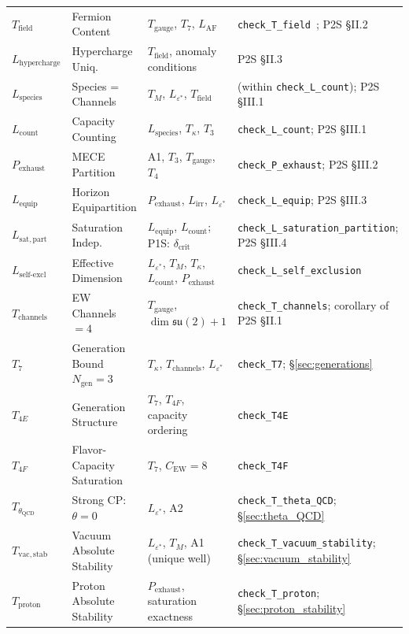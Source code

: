 \documentclass[11pt]{article}
\begin{document}
\begin{center}
\begin{tabular}{lp{3.2cm}p{4.5cm}l}
$T_{\mathrm{field}}$ & Fermion Content & $T_{\mathrm{gauge}}$, $T_7$, $L_{\mathrm{AF}}$ & \texttt{check\_T\_field}~\cite{BrookeFermionScan}; P2S \S II.2 \\
$L_{\mathrm{hypercharge}}$ & Hypercharge Uniq. & $T_{\mathrm{field}}$, anomaly conditions & P2S \S II.3 \\
$L_{\mathrm{species}}$ & Species = Channels & $T_M$, $L_{\varepsilon^*}$, $T_{\mathrm{field}}$ & (within \texttt{check\_L\_count}); P2S \S III.1 \\
$L_{\mathrm{count}}$ & Capacity Counting & $L_{\mathrm{species}}$, $T_\kappa$, $T_3$ & \texttt{check\_L\_count}; P2S \S III.1 \\
$P_{\mathrm{exhaust}}$ & MECE Partition & A1, $T_3$, $T_{\mathrm{gauge}}$, $T_4$ & \texttt{check\_P\_exhaust}; P2S \S III.2 \\
$L_{\mathrm{equip}}$ & Horizon Equipartition & $P_{\mathrm{exhaust}}$, $L_{\mathrm{irr}}$, $L_{\varepsilon^*}$ & \texttt{check\_L\_equip}; P2S \S III.3 \\
$L_{\mathrm{sat,part}}$ & Saturation Indep. & $L_{\mathrm{equip}}$, $L_{\mathrm{count}}$; P1S: $\delta_{\mathrm{crit}}$ & \texttt{check\_L\_saturation\_partition}; P2S \S III.4 \\
$L_{\mathrm{self\text{-}excl}}$ & Effective Dimension & $L_{\varepsilon^*}$, $T_M$, $T_\kappa$, $L_{\mathrm{count}}$, $P_{\mathrm{exhaust}}$ & \texttt{check\_L\_self\_exclusion} \\
$T_{\mathrm{channels}}$ & EW Channels $= 4$ & $T_{\mathrm{gauge}}$, $\dim\mathfrak{su}(2) + 1$ & \texttt{check\_T\_channels}; corollary of P2S \S II.1 \\
$T_7$ & Generation Bound $N_{\mathrm{gen}} = 3$ & $T_\kappa$, $T_{\mathrm{channels}}$, $L_{\varepsilon^*}$ & \texttt{check\_T7}; \S\ref{sec:generations} \\
$T_{4E}$ & Generation Structure & $T_7$, $T_{4F}$, capacity ordering & \texttt{check\_T4E} \\
$T_{4F}$ & Flavor-Capacity Saturation & $T_7$, $C_{\mathrm{EW}} = 8$ & \texttt{check\_T4F} \\
$T_{\theta_{\mathrm{QCD}}}$ & Strong CP: $\theta = 0$ & $L_{\varepsilon^*}$, A2 & \texttt{check\_T\_theta\_QCD}; \S\ref{sec:theta_QCD} \\
$T_{\mathrm{vac,stab}}$ & Vacuum Absolute Stability & $L_{\varepsilon^*}$, $T_M$, A1 (unique well) & \texttt{check\_T\_vacuum\_stability}; \S\ref{sec:vacuum_stability} \\
$T_{\mathrm{proton}}$ & Proton Absolute Stability & $P_{\mathrm{exhaust}}$, saturation exactness & \texttt{check\_T\_proton}; \S\ref{sec:proton_stability} \\
\bottomrule
\end{tabular}
\end{center}
\end{document}
